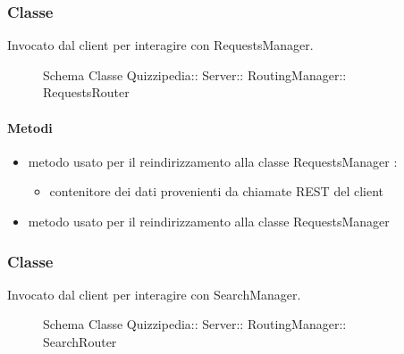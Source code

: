 \subsubsection{Classe }
Invocato dal client per interagire con RequestsManager.
\begin{figure}[H]
\centering
\noindent{}
\caption[Schema Classe RequestsRouter]{Schema Classe Quizzipedia:: Server:: RoutingManager:: RequestsRouter}
\end{figure}
\paragraph{Metodi}
\begin{itemize}
\item {}
\newline
metodo usato per il reindirizzamento alla classe RequestsManager
\newline
{} :
\begin{itemize}
\item {}
\newline
contenitore dei dati provenienti da chiamate REST del client
\end{itemize}
\item {}
\newline
metodo usato per il reindirizzamento alla classe RequestsManager
\newline
\end{itemize}
\subsubsection{Classe }
Invocato dal client per interagire con SearchManager.
\begin{figure}[H]
\centering
\noindent{}
\caption[Schema Classe SearchRouter]{Schema Classe Quizzipedia:: Server:: RoutingManager:: SearchRouter}
\end{figure}

